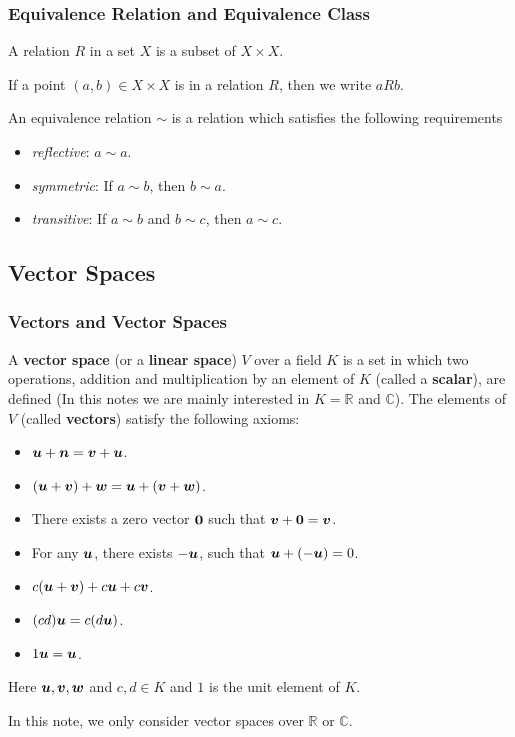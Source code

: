 \documentclass[10pt]{article}
\begin{document}
\subsubsection{Equivalence Relation and Equivalence Class}
\begin{definition}[Relation]
    A relation $R$ in a set $X$ is a subset of $X\times X$.
\end{definition}
If a point $(a,b)\in X\times X$ is in a relation $R$, then we write $aRb$.
\begin{definition}
    An equivalence relation $\sim$ is a relation which satisfies the following requirements
    \begin{itemize}
        \item \textit{reflective}: $a\sim a$.
        \item \textit{symmetric}: If $a\sim b$, then $b\sim a$.
        \item \textit{transitive}: If $a\sim b$ and $b\sim c$, then $a\sim c$.
    \end{itemize}
\end{definition}
\subsection{Vector Spaces}
\subsubsection{Vectors and Vector Spaces}
\begin{definition}
    A \textbf{vector space} (or a \textbf{linear space}) $V$ over a field $K$ is a set in which two operations, addition and multiplication by an element of $K$ (called a \textbf{scalar}),
    are defined (In this notes we are mainly interested in $K=\mathbb{R}$ and $\mathbb{C}$).
    The elements of $V$ (called \textbf{vectors}) satisfy the following axioms:
    \begin{itemize}
        \item $\vb*{u}+\vb*{n}=\vb*{v}+\vb*{u}$.
        \item $(\vb*{u}+\vb*{v})+\vb*{w}=\vb*{u}+(\vb*{v}+\vb*{w})$.
        \item There exists a zero vector $\vb*{0}$ such that $\vb*{v}+\vb*{0}=\vb*{v}$.
        \item For any $\vb*{u}$, there exists $-\vb*{u}$, such that $\vb*{u}+(-\vb*{u})=0$.
        \item $c(\vb*{u}+\vb*{v})+c\vb*{u}+c\vb*{v}$.
        \item $(cd)\vb*{u}=c(d\vb*{u})$.
        \item $1 \vb*{u}=\vb*{u}$.
    \end{itemize}
    Here $\vb*{u}, \vb*{v}, \vb*{w}$ and $c,d\in K$ and $1$ is the unit element of $K$.
\end{definition}
In this note, we only consider vector spaces over $\mathbb{R}$ or $\mathbb{C}$.
\end{document}
